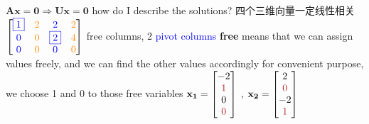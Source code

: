 \documentclass[12pt, a4paper]{article}
\begin{document}
{\vspace{14pt}
\newline
\begin{math}
	{\mathbf{A}}{\mathbf{x}} = {\mathbf{0}}
	\Longrightarrow
	{\mathbf{U}}{\mathbf{x}} = {\mathbf{0}}
\end{math}
\qquad {\textcolor{anhao-scarlet}{same solutions, same null space}}
\vspace{14pt}
\newline
how do I describe the solutions?
\newline
四个三维向量一定线性相关
\vspace{14pt}
\newline
\begin{math}
	\begin{bmatrix}
		{\textcolor{blue}{\boxed{1}}} & {\textcolor{anhao-orange}{2}} & {\textcolor{blue}{2}} & {\textcolor{anhao-orange}{2}} \\
		{\textcolor{blue}{0}} & {\textcolor{anhao-orange}{0}} & {\textcolor{blue}{\boxed{2}}} & {\textcolor{anhao-orange}{4}} \\
		{\textcolor{blue}{0}} & {\textcolor{anhao-orange}{0}} & {\textcolor{blue}{0}} & {\textcolor{anhao-orange}{0}} 
	\end{bmatrix}
\end{math}
 {\textcolor{anhao-orange}{free columns}}, 
2 {\textcolor{blue}{pivot columns}}
\newline
{\bf{free}} means that we can assign values freely, and we can find the other values accordingly
\vspace{14pt}
\newline
for convenient purpose, we choose 1 and 0 to those free variables
\vspace{14pt}
\newline
\begin{math}
	{\mathbf{x_1}} = 
	\begin{bmatrix}
		-2 \\
		{\textcolor{anhao-scarlet}{1}} \\
		0 \\
		{\textcolor{anhao-scarlet}{0}}
	\end{bmatrix}
\end{math}
 , 
\begin{math}
	{\mathbf{x_2}} = 
	\begin{bmatrix}
		2 \\
		{\textcolor{anhao-scarlet}{0}} \\
		-2 \\
		{\textcolor{anhao-scarlet}{1}}

\end{bmatrix}
\end{math}}
\end{document}

